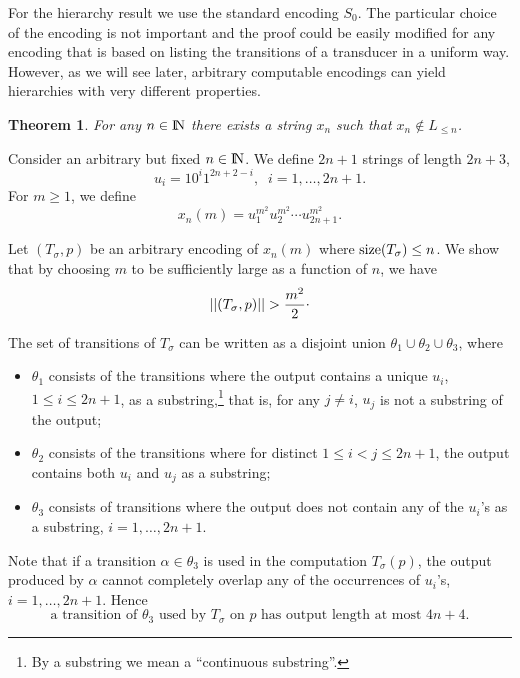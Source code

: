 \documentclass[copyright]{eptcs}
\def\bbbn{{\rm I\!N}} \def\vs{\vspace{3mm}}
\def \proof{\bigbreak\noindent{\bf Proof.\ \ }}
\def\bbbn{{\rm I\!N}} \def\vs{\vspace{3mm}}
\newtheorem{theorem}{T\/heorem}[section]
\begin{document}
For the hierarchy result we use the standard encoding $S_0$.
The particular choice of the 
encoding  is not important and the proof could be easily modified
for any encoding that is based on listing the transitions of
a transducer in a uniform way.
However, as we will see later, arbitrary computable encodings can yield
hierarchies with very different properties.


\begin{theorem}
\label{se-ketta}
For any $n \in \bbbn$ there exists a string
$x_n$ such that $x_n \not\in L_{\leq n}$.
\end{theorem}
\proof
Consider an arbitrary but fixed $n \in \bbbn$. 
We define $2n+1$ strings of length $2n+3$,
$$
u_i = 10^i1^{2n+2-i}, \;\; i = 1,\ldots,2n+1.
$$
For $m \geq 1$, we define
$$
x_n(m) = u_1^{m^2} u_2^{m^2} \cdots u_{2n+1}^{m^2}.
$$

Let $(T_\sigma, p)$ be an arbitrary encoding of $x_n(m)$ where
${\rm size}(T_\sigma) \leq n$.
We show that by choosing $m$ to be sufficiently large as a function of
$n$, we have
\begin{equation}
\label{oatta}
||(T_\sigma, p)|| > \frac{m^2}{2}\raisebox{0.5ex}{.}
\end{equation}

The set of transitions of $T_\sigma$ can be written
as a disjoint union $\theta_1 \cup \theta_2 \cup \theta_3$,
where
\begin{itemize}
\item $\theta_1$ consists of the transitions where the output
contains a unique $u_i$, $1 \leq i \leq 2n+1$, as a 
substring,\footnote{By a substring we mean a ``continuous
substring''.}
that is, for any $j \neq i$, $u_j$ is not a substring of the output;
\item $\theta_2$ consists of the transitions where for distinct
$1 \leq i < j \leq 2n+1$, the output contains both $u_i$ and 
$u_j$ as a substring;
\item $\theta_3$ consists of transitions where the output
does not contain any of the $u_i$'s as a substring,
$i = 1, \ldots, 2n+1$.
\end{itemize}

Note that if a transition $\alpha \in \theta_3$ is used
in the computation $T_{\sigma}(p)$, the output produced by
$\alpha$ cannot completely overlap any of the occurrences
of $u_i$'s, $i = 1,\ldots,2n+1$.
Hence 
\begin{equation}
\label{oatta2}
\mbox{a transition of $\theta_3$  used  
by $T_{\sigma}$ on $p$ has output length at most $4n+4$.}
\end{equation}
\end{document}
